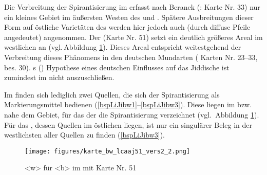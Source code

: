 {Die Verbreitung der Spirantisierung im  erfasst nach Beranek (: Karte Nr. 33) nur ein kleines Gebiet im äußersten Westen des  und \hai{{\SWJ}}. Spätere Ausbreitungen dieser Form auf östliche Varietäten des \hai{{\WJ}} werden hier jedoch auch (durch diffuse Pfeile angedeutet) angenommen. Der  (Karte Nr. 51) setzt ein deutlich größeres Areal im westlichen \hai{{\WJ}} an (vgl.\,Abbildung \ref{kartebwlcaaj}). Dieses Areal entspricht weitestgehend der Verbreitung dieses Phänomens in den deutschen Mundarten ( Karten Nr. 23–33, bes. 30). \citeauthor{Bin-Nun1973}s (\citeyear[357]{Bin-Nun1973}) Hypothese eines deutschen Einflusses auf das Jiddische ist zumindest im \hai{{\WJ}} nicht auszuschließen.
  
Im  finden sich lediglich zwei Quellen, die sich der Spirantisierung als Markierungsmittel bedienen (\ref{bspLiJibw1}–\ref{bspLiJibw3}). Diese liegen im bzw. nahe dem Gebiet, für das der  die Spirantisierung verzeichnet (vgl.\, Abbildung \ref{kartebwlcaaj}). Für das , dessen Quellen im östlichen \hai{{\WJ}} liegen, ist nur ein singulärer Beleg in der westlichsten aller Quellen zu finden (\ref{bspLiJibw3}).

 
		  \begin{figure}
		\centering
\texttt{[image: figures/karte\_bw\_lcaaj51\_vers2\_2.png]}
		\caption{\label{kartebwlcaaj} <w> für <b> im  mit  Karte Nr. 51}
\end{figure}

}
